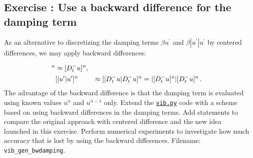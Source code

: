 \documentclass[%
oneside,                 %
final,                   %
10pt]{article}
\newenvironment{doconceexercise}{}{}
\newcounter{doconceexercisecounter}
\begin{document}
\begin{doconceexercise}

\subsection*{Exercise \thedoconceexercisecounter: Use a backward difference for the damping term}

\label{vib:exer:quad:damping:bw}

As an alternative to discretizing the damping terms $\beta u^{\prime}$ and
$\beta |u^{\prime}|u^{\prime}$ by centered differences, we may apply
backward differences:

\begin{align*}
[u^{\prime}]^n &\approx [D_t^-u]^n,\\ 
& [|u^{\prime}|u^{\prime}]^n &\approx [|D_t^-u|D_t^-u]^n
= |[D_t^-u]^n|[D_t^-u]^n\tp
\end{align*}
The advantage of the backward difference is that the damping term is
evaluated using known values $u^n$ and $u^{n-1}$ only.
Extend the \href{{http://tinyurl.com/nm5587k/vib/vib.py}}{\nolinkurl{vib.py}} code with a scheme based
on using backward differences in the damping terms. Add statements
to compare the original approach with centered difference and the
new idea launched in this exercise. Perform numerical experiments
to investigate how much accuracy that is lost by using the backward
differences.
\noindent Filename: \Verb!vib_gen_bwdamping!.

\end{doconceexercise}
\end{document}
